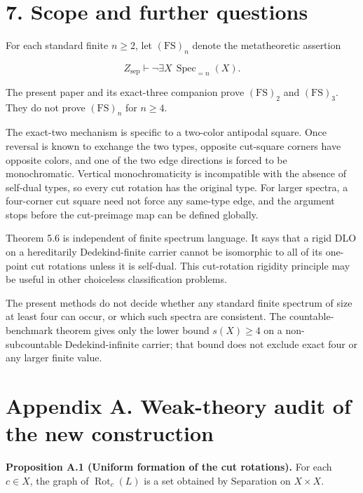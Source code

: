 \documentclass[
  english,
  11pt,
  reqno]{amsart}
\begin{document}
\section{7. Scope and further
questions}\label{scope-and-further-questions}

For each standard finite \(n\ge2\), let \((\mathrm{FS})_n\) denote the
metatheoretic assertion

\[
Z_{\mathrm{sep}}
\vdash
\neg\exists X\,
\operatorname{Spec}_{=n}(X).
\]

The present paper and its exact-three companion prove
\((\mathrm{FS})_2\) and \((\mathrm{FS})_3\). They do not prove
\((\mathrm{FS})_n\) for \(n\ge4\).

The exact-two mechanism is specific to a two-color antipodal square.
Once reversal is known to exchange the two types, opposite cut-square
corners have opposite colors, and one of the two edge directions is
forced to be monochromatic. Vertical monochromaticity is incompatible
with the absence of self-dual types, so every cut rotation has the
original type. For larger spectra, a four-corner cut square need not
force any same-type edge, and the argument stops before the cut-preimage
map can be defined globally.

Theorem 5.6 is independent of finite spectrum language. It says that a
rigid DLO on a hereditarily Dedekind-finite carrier cannot be isomorphic
to all of its one-point cut rotations unless it is self-dual. This
cut-rotation rigidity principle may be useful in other choiceless
classification problems.

The present methods do not decide whether any standard finite spectrum
of size at least four can occur, or which such spectra are consistent.
The countable-benchmark theorem gives only the lower bound \(s(X)\ge4\)
on a non-subcountable Dedekind-infinite carrier; that bound does not
exclude exact four or any larger finite value.

\protect{}\label{app:weak-audit}

\section{Appendix A. Weak-theory audit of the new
construction}\label{appendix-a.-weak-theory-audit-of-the-new-construction}

\protect{}\label{prop:a-1-cut-relations}

\textbf{Proposition A.1 (Uniform formation of the cut rotations).} For
each \(c\in X\), the graph of \(\operatorname{Rot}_c(L)\) is a set
obtained by Separation on \(X\times X\).
\end{document}
